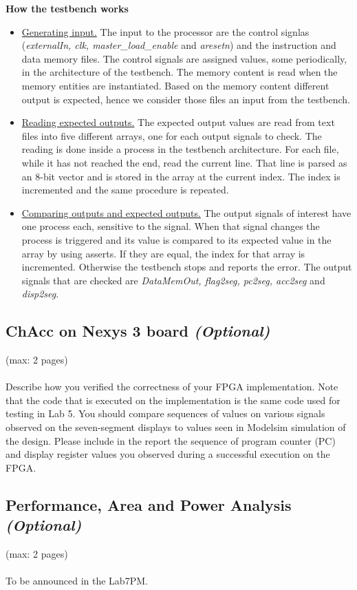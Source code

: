 \documentclass[a4paper,11pt]{article}
\begin{document}
\textbf{How the testbench works}
\begin{itemize}
  \item \underline{Generating input.} The input to the processor are the control signlas (\textit{externalIn, clk, master\_load\_enable} and \textit{aresetn}) and the instruction and data memory files. The control signals are assigned values, some periodically,  in the architecture of the testbench. The memory content is read when the memory entities are instantiated. Based on the memory content different output is expected, hence we consider those files an input from the testbench.
  \item \underline{Reading expected outputs.} The expected output values are read from text files into five different arrays, one for each output signals to check. The reading is done inside a process in the testbench architecture. For each file, while it has not reached the end, read the current line. That line is parsed as an 8-bit vector and is stored in the array at the current index. The index is incremented and the same procedure is repeated.
  \item \underline{Comparing outputs and expected outputs.} The output signals of interest have one process each, sensitive to the signal. When that signal changes the process is triggered and its value is compared to its expected value in the array by using asserts. If they are equal, the index for that array is incremented. Otherwise the testbench stops and reports the error. The output signals that are checked are \textit{DataMemOut, flag2seg, pc2seg, acc2seg} and \textit{disp2seg}.
\end{itemize}

\subsection{ChAcc on Nexys 3 board \emph{(Optional)}}
(max: 2 pages)
\\\\
Describe how you verified the correctness of your FPGA implementation. Note that the code that is executed on the implementation is the same code used for testing in Lab 5. You should compare sequences of values on various signals observed on the seven-segment displays to values seen in Modelsim simulation of the design. Please include in the report the sequence of program counter (PC) and display register values you observed during a successful execution on the FPGA. 

\subsection{Performance, Area and Power Analysis \emph{(Optional)}}
(max: 2 pages)
\\\\
To be announced in the Lab7PM.
\end{document}
